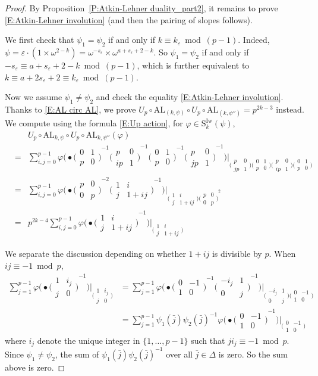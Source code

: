 \documentclass[12pt]{amsart}
\theoremstyle{definition}
\numberwithin{equation}{subsection}
\def\rmS{\mathrm{S}}
\newcommand{\AL}{\mathrm{AL}}
\newcommand{\Iw}{\mathrm{Iw}}
\newcommand{\Matrix}[4]{{\big(\begin{smallmatrix}#1&#2\\#3& #4\end{smallmatrix} \big)}}
\begin{document}
\begin{proof}
By Proposition~\ref{P:Atkin-Lehner duality_part2}, it remains to prove \eqref{E:Atkin-Lehner involution} (and then the pairing of slopes follows).

We first check that $\psi_1 = \psi_2$ if and only if $k \equiv k_\varepsilon \bmod {(p-1)}$. Indeed, $\psi = \varepsilon \cdot (1\times \omega^{2-k}) = \omega^{-s_\varepsilon} \times \omega^{a+s_\varepsilon +2-k}$. So $\psi_1 = \psi_2 $ if and only if $-s_\varepsilon \equiv a+s_\varepsilon+2 -k \bmod{(p-1)}$, which is further equivalent to $k \equiv a+2s_\varepsilon +2\equiv k_\varepsilon \bmod{(p-1)}$.

Now we assume $\psi_1 \neq \psi_2$ and check the equality \eqref{E:Atkin-Lehner involution}.
Thanks to \eqref{E:AL circ AL}, we prove $ U_p \circ \AL_{(k, \psi)} \circ U_p\circ \AL_{(k, \psi'')} = p^{2k-3}$ instead.
We compute using the formula \eqref{E:Up action}, for $\varphi \in \rmS_{k}^\Iw(\psi)$, 
\begin{eqnarray}
\label{E:U AL U AL computation}
&&U_p \circ \AL_{k, \psi} \circ U_p \circ  \AL_{k, \psi''} (\varphi)
\\
\nonumber
&=& \sum_{i,j  =0}^{p-1} \varphi \big(\bullet{\Matrix 01p0}^{-1} {\Matrix p0{ip} 1}^{-1} {\Matrix 01p0}^{-1} {\Matrix p0{jp}1}^{-1} \big) \big|_{{ \Matrix p0{jp} 1} \Matrix 01p0 {\Matrix p0{ip}1}\Matrix 01p0}
\\ \nonumber
&= & \sum_{i,j  =0}^{p-1} \varphi \big(\bullet {\Matrix p00p}^{-2} {\Matrix 1ij{1+ij}}^{-1} \big) \big|_{{ \Matrix 1ij{1+ij}{\Matrix p00p}}^2 }
\\ \nonumber
&= & p^{2k-4}\sum_{i,j  =0}^{p-1} \varphi \big(\bullet {\Matrix 1ij{1+ij}}^{-1} \big) \big|_{\Matrix 1ij{1+ij}}
\end{eqnarray}

We separate the discussion depending on whether $1+ij$ is divisible by $p$.
When $ij \equiv -1 \bmod p$, 
\begin{align*}
\sum_{ j = 1}^{p-1} \varphi  \big(\bullet {\Matrix 1{i_j}j0}^{-1} \big) \big|_{\Matrix 1{i_j} j0} &= \sum_{ j = 1}^{p-1} \varphi  \big(\bullet{\Matrix0{-1}10}^{-1} {\Matrix {-i_j}10j}^{-1} \big) \big|_{\Matrix {-i_j}10j \Matrix 0{-1}10} 
\\
&= \sum_{ j = 1}^{p-1} \psi_1(\bar j)\psi_2(\bar j)^{-1} \varphi  \big(\bullet{\Matrix0{-1}10}^{-1}\big) \big|_{\Matrix 0{-1}10} 
\end{align*}
where $i_j$ denote the unique integer in $\{1, \dots, p-1\}$ such that $j i_j \equiv -1 \bmod p$. Since $\psi_1 \neq \psi_2$, the sum of $\psi_1(\bar j) \psi_2(\bar j)^{-1}$ over all $\bar j  \in \Delta$ is zero. So the sum above is zero.


\end{proof}
\end{document}
